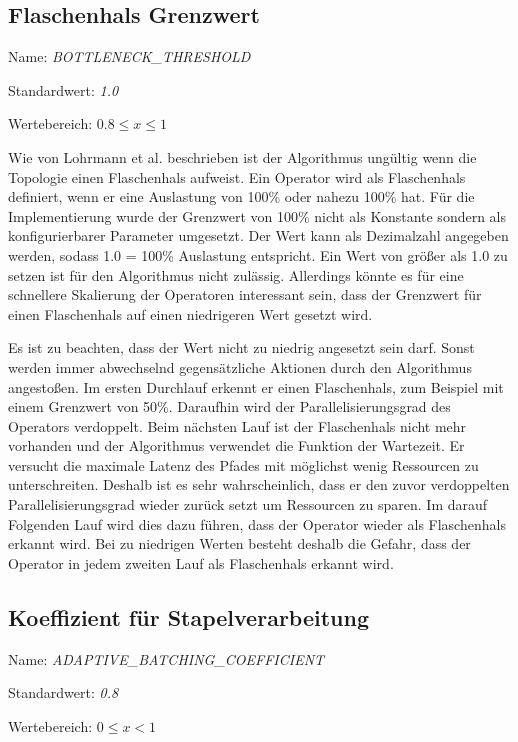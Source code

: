 \subsection{Flaschenhals Grenzwert}

Name: \textit{BOTTLENECK\_THRESHOLD}

Standardwert: \textit{1.0}

Wertebereich: \textit{\(0.8 \leq x \leq 1\)}

Wie von Lohrmann et al. beschrieben ist der Algorithmus ungültig wenn die Topologie einen Flaschenhals aufweist.
Ein Operator wird als Flaschenhals definiert, wenn er eine Auslastung von 100\% oder nahezu 100\% hat.
Für die Implementierung wurde der Grenzwert von 100\% nicht als Konstante sondern als konfigurierbarer Parameter umgesetzt.
Der Wert kann als Dezimalzahl angegeben werden, sodass 1.0 = 100\% Auslastung entspricht.
Ein Wert von größer als 1.0 zu setzen ist für den Algorithmus nicht zulässig.
Allerdings könnte es für eine schnellere Skalierung der Operatoren interessant sein, dass der Grenzwert für einen Flaschenhals auf einen niedrigeren Wert gesetzt wird.

Es ist zu beachten, dass der Wert nicht zu niedrig angesetzt sein darf.
Sonst werden immer abwechselnd gegensätzliche Aktionen durch den Algorithmus angestoßen.
Im ersten Durchlauf erkennt er einen Flaschenhals, zum Beispiel mit einem Grenzwert von 50\%.
Daraufhin wird der Parallelisierungsgrad des Operators verdoppelt.
Beim nächsten Lauf ist der Flaschenhals nicht mehr vorhanden und der Algorithmus verwendet die Funktion der Wartezeit.
Er versucht die maximale Latenz des Pfades mit möglichst wenig Ressourcen zu unterschreiten.
Deshalb ist es sehr wahrscheinlich, dass er den zuvor verdoppelten Parallelisierungsgrad wieder zurück setzt um Ressourcen zu sparen.
Im darauf Folgenden Lauf wird dies dazu führen, dass der Operator wieder als Flaschenhals erkannt wird.
Bei zu niedrigen Werten besteht deshalb die Gefahr, dass der Operator in jedem zweiten Lauf als Flaschenhals erkannt wird.

\subsection{Koeffizient für Stapelverarbeitung}

Name: \textit{ADAPTIVE\_BATCHING\_COEFFICIENT}

Standardwert: \textit{0.8}

Wertebereich: \textit{\(0 \leq x < 1\)}

